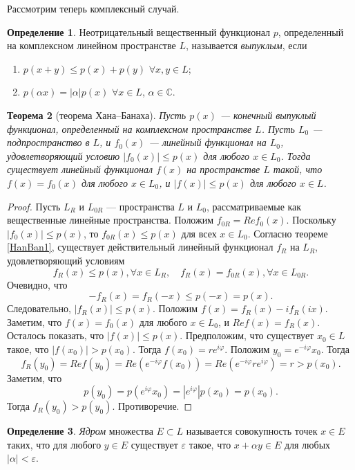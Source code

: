 \documentclass[12pt, titlepage, oneside]{amsbook}
\newcommand{\CC}{\mathbb{C}}
\newtheorem{theorem}{Теорема}[chapter]
\theoremstyle{definition}
\newtheorem{definition}[theorem]{Определение}
\theoremstyle{remark}
\begin{document}
Рассмотрим теперь комплексный случай.

\begin{definition}
Неотрицательный вещественный функционал $p$, определенный на комплексном линейном пространстве $L$, называется \emph{выпуклым}, если
\begin{enumerate}
\item $p(x+y)\leq p(x)+p(y)$ $\forall x,y\in L$;
\item $p(\alpha x)=|\alpha| p(x)$ $\forall x\in L$, $\alpha\in\CC$.
\end{enumerate}
\end{definition}

\begin{theorem}[теорема Хана--Банаха]
\label{HanBan2}
Пусть $p(x)$ --- конечный выпуклый функционал, определенный на комплексном пространстве $L$. Пусть $L_0$ --- подпространство в $L$, и $f_0(x)$ --- линейный функционал на $L_0$, удовлетворяющий условию $|f_0(x)|\leq p(x)$ для любого $x\in L_0$. Тогда существует линейный функционал $f(x)$ на пространстве $L$ такой, что $f(x)=f_0(x)$ для любого $x\in L_0$, и $|f(x)|\leq p(x)$ для любого $x\in L$.
\end{theorem}

\begin{proof}
Пусть $L_R$ и $L_{0R}$ --- пространства $L$ и $L_0$, рассматриваемые как вещественные линейные пространства. Положим $f_{0R}= Re f_0(x)$. Поскольку $|f_0(x)|\leq p(x)$, то $f_{0R}(x)\leq p(x)$ для всех $x\in L_0$. Согласно теореме \ref{HanBan1}, существует  действительный линейный функционал $f_R$ на $L_R$, удовлетворяющий условиям $$f_R(x)\leq p(x),\forall x\in L_R,\quad f_R(x)=f_{0R}(x),\forall x\in L_{0R}.$$ Очевидно, что $$-f_R(x)=f_R(-x)\leq p(-x)=p(x).$$ Следовательно, $|f_R(x)|\leq p(x)$. Положим $f(x)=f_R(x)-if_R(ix)$. Заметим, что $f(x)=f_0(x)$ для любого $x\in L_0$, и $Re f(x)=f_R(x)$. Осталось показать, что $|f(x)|\leq p(x)$.  Предположим, что существует $x_0\in L$ такое, что $|f(x_0)|>p(x_0)$. Тогда $f(x_0)=re^{i\varphi}$. Положим $y_0=e^{-i\varphi}x_0$. Тогда $$f_R(y_0)=Re f(y_0)=Re(e^{-i\varphi}f(x_0))=Re(e^{-i\varphi}re^{i\varphi})=r>p(x_0).$$ Заметим, что $$p(y_0)=p(e^{i\varphi}x_0)=|e^{i\varphi}|p(x_0)=p(x_0).$$ Тогда $f_R(y_0)>p(y_0)$. Противоречие.
\end{proof}

\begin{definition}
\emph{Ядром} множества $E\subset L$ называется совокупность точек $x\in E$ таких, что для любого $y\in E$ существует $\varepsilon$ такое, что $x+\alpha y\in E$ для любых $|\alpha|<\varepsilon$.
\end{definition}
\end{document}
